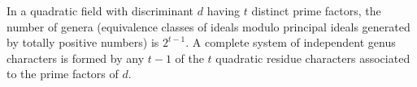 In a quadratic field with discriminant $d$ having $t$ distinct prime factors, the number of genera (equivalence classes of ideals modulo principal ideals generated by totally positive numbers) is $2^{t-1}$. A complete system of independent genus characters is formed by any $t-1$ of the $t$ quadratic residue characters associated to the prime factors of $d$.
